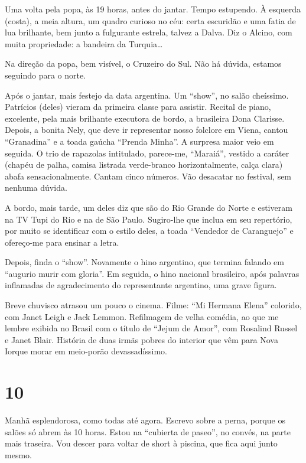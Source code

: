 Uma volta pela popa, às 19 horas, antes do jantar. Tempo estupendo. À esquerda (costa), a meia altura, um quadro curioso no céu: certa escuridão e uma fatia de lua brilhante, bem junto a fulgurante estrela, talvez a Dalva. Diz o Alcino, com muita propriedade: a bandeira da Turquia\ldots

Na direção da popa, bem visível, o Cruzeiro do Sul. Não há dúvida, estamos seguindo para o norte.

Após o jantar, mais festejo da data argentina. Um ``show'', no salão cheíssimo. Patrícios (deles) vieram da primeira classe para assistir. Recital de piano, excelente, pela mais brilhante executora de bordo, a brasileira Dona Clarisse. Depois, a bonita Nely, que deve ir representar nosso folclore em Viena, cantou ``Granadina'' e a toada gaúcha ``Prenda Minha''. A surpresa maior veio em seguida. O trio de rapazolas intitulado, parece-me, ``Maraiá'', vestido a caráter (chapéu de palha, camisa listrada verde-branco horizontalmente, calça clara) abafa sensacionalmente. Cantam cinco números. Vão desacatar no festival, sem nenhuma dúvida.

A bordo, mais tarde, um deles diz que são do Rio Grande do Norte e estiveram na TV Tupi do Rio e na de São Paulo. Sugiro-lhe que inclua em seu repertório, por muito se identificar com o estilo deles, a toada ``Vendedor de Caranguejo'' e ofereço-me para ensinar a letra.

Depois, finda o ``show''. Novamente o hino argentino, que termina falando em ``augurio murir com gloria''. Em seguida, o hino nacional brasileiro, após palavras inflamadas de agradecimento do representante argentino, uma grave figura.

Breve chuvisco atrasou um pouco o cinema. Filme: ``Mi Hermana Elena'' colorido, com Janet Leigh e Jack Lemmon. Refilmagem de velha comédia, ao que me lembre exibida no Brasil com o título de ``Jejum de Amor'', com Rosalind Russel e Janet Blair. História de duas irmãs pobres do interior que vêm para Nova Iorque morar em meio-porão devassadíssimo.

\section*{10 \adfflatleafright {}}

Manhã esplendorosa, como todas até agora. Escrevo sobre a perna, porque os salões só abrem às 10 horas. Estou na ``cubierta de paseo'', no convés, na parte mais traseira. Vou descer para voltar de short à piscina, que fica aqui junto mesmo.


